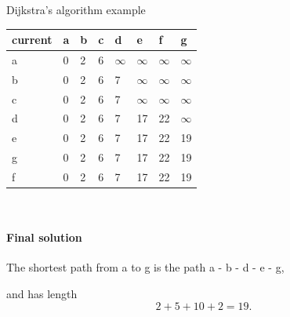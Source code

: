 \begin{example}{Dijkstra's algorithm example}
\begin{minipage}{0.5\textwidth}
\end{minipage}
\begin{minipage}{0.5\textwidth}
 \begin{tabular}{|l|l|l|l|l|l|l|l|}
    \hline
        current & a & b & c & d & e & f & g \\ \hline
        a & 0 & 2 & 6 & $\infty$ & $\infty$ & $\infty$& $\infty$  \\ \hline
        b & 0 & 2 & 6 & 7 & $\infty$ & $\infty$ & $\infty$ \\ \hline
        c & 0 & 2 & 6 & 7 & $\infty$ & $\infty$ & $\infty$  \\ \hline
        d & 0 & 2 & 6 & 7 & 17 & 22 & $\infty$ \\ \hline
        e & 0 & 2 & 6 & 7 & 17 & 22 & 19 \\ \hline
        g & 0 & 2 & 6 & 7 & 17 & 22 & 19  \\ \hline
        f & 0 & 2 & 6 & 7 & 17 & 22 & 19  \\ \hline
    \end{tabular}
\end{minipage}\\

\paragraph{Final solution} 
The shortest path from a to g is the path a - b - d - e - g, 
\begin{center}
\par{}\label{fig:dijkstra-soln}%

\end{center} 
and has length 
$$
2 + 5 + 10 + 2 = 19.
$$
\end{example}

\newpage
\newpage

